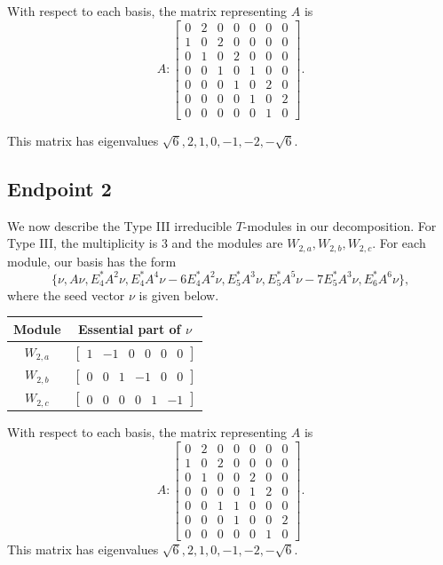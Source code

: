 \documentclass[12pt,letterpaper]{article}
\newcommand{\rowvector}[1]{\begin{bmatrix} #1 \end{bmatrix}}
\begin{document}
With respect to each basis, the matrix representing $A$ is 
\begin{equation}
    A: \begin{bmatrix}
  0 & 2 & 0 & 0 & 0 & 0 & 0 \\
  1 & 0 & 2 & 0 & 0 & 0 & 0 \\
  0 & 1 & 0 & 2 & 0 & 0 & 0 \\
  0 & 0 & 1 & 0 & 1 & 0 & 0 \\
  0 & 0 & 0 & 1 & 0 & 2 & 0 \\
  0 & 0 & 0 & 0 & 1 & 0 & 2 \\
  0 & 0 & 0 & 0 & 0 & 1 & 0 \end{bmatrix}.
\label{eq:fos-II}
\end{equation}

This matrix has eigenvalues $\sqrt{6}, 2, 1, 0, -1, -2, -\sqrt{6}$.

\subsection{Endpoint 2}

We now describe the Type III irreducible $T$-modules in our decomposition. For Type III, the multiplicity is 3 and the modules are $W_{2,a},W_{2,b},W_{2,c}$. For each module, our basis has the form 
\begin{equation*}
    \{\nu, A\nu, E_4^*A^2\nu,  E_4^*A^4\nu - 6E_4^*A^2\nu, E_5^*A^3\nu,E_5^*A^5\nu - 7E_5^*A^3\nu, E_6^*A^6\nu\},
\end{equation*} 
where the seed vector $\nu$ is given below.
\begin{center}
    \begin{tabular}{c | c}
    \toprule
       \textbf{Module}  & \textbf {Essential part of }$\nu$ \\
       \midrule
       $W_{2,a}$  & $\rowvector{1 & -1 & 0 & 0 & 0 & 0}$ \\[1.67pt]
       $W_{2,b}$  & $\rowvector{0 & 0 & 1 & -1 & 0 & 0}$ \\[1.67pt]
       $W_{2,c}$  & $\rowvector{0 & 0 & 0 & 0 & 1 & -1}$ \\
    \bottomrule
   \end{tabular}
\end{center}

With respect to each basis, the matrix representing $A$ is 
\begin{equation}
    A: \begin{bmatrix}
  0 & 2 & 0 & 0 & 0 & 0 & 0 \\
  1 & 0 & 2 & 0 & 0 & 0 & 0 \\
  0 & 1 & 0 & 0 & 2 & 0 & 0 \\
  0 & 0 & 0 & 0 & 1 & 2 & 0 \\
  0 & 0 & 1 & 1 & 0 & 0 & 0 \\
  0 & 0 & 0 & 1 & 0 & 0 & 2 \\
  0 & 0 & 0 & 0 & 0 & 1 & 0 \end{bmatrix}.
\label{eq:fos-III}
\end{equation}
This matrix has eigenvalues $\sqrt{6}, 2, 1, 0, -1, -2, -\sqrt{6}$.
\end{document}
